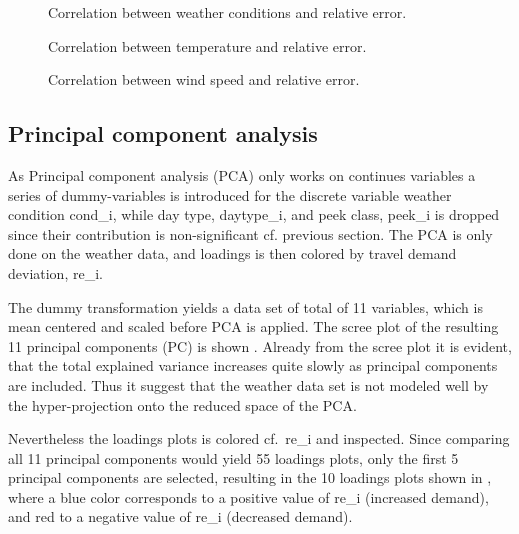 \vspace{-1em}
\begin{figure}[!ht]
    \center
    
    \vspace{-1em}
    \caption{Correlation between weather conditions and relative error.}
    \label{fig:cor_cond}
\end{figure}
\vspace{-1em}
\clearpage

\begin{figure}[!ht]
    \center
    
    \vspace{-1em}
    \caption{Correlation between temperature and relative error.}
    \label{fig:cor_temp}
\end{figure}

\begin{figure}[!ht]
    \center
    
    \caption{Correlation between wind speed and relative error.}
    \label{fig:cor_ws}
\end{figure}

\subsection{Principal component analysis}
As Principal component analysis (PCA) only works on continues variables a series of dummy-variables is introduced for the discrete variable weather condition \gls{cond_i}, while day type, \gls{daytype_i}, and peek class, \gls{peek_i} is dropped since their contribution is non-significant cf. previous section. The PCA is only done on the weather data, and loadings is then colored by travel demand deviation, \gls{re_i}.

The dummy transformation yields a data set of total of 11 variables, which is mean centered and scaled before PCA is applied. The scree plot of the resulting 11 principal components (PC) is shown . Already from the scree plot it is evident, that the total explained variance increases quite slowly as principal components are included. Thus it suggest that the weather data set is not modeled well by the hyper-projection onto the reduced space of the PCA.

Nevertheless the loadings plots is colored cf.\ \gls{re_i} and inspected. Since comparing all 11 principal components would yield 55 loadings plots, only the first 5 principal components are selected, resulting in the 10 loadings plots shown in , where a blue color corresponds to a positive value of \gls{re_i} (increased demand), and red to a negative value of \gls{re_i} (decreased demand).

